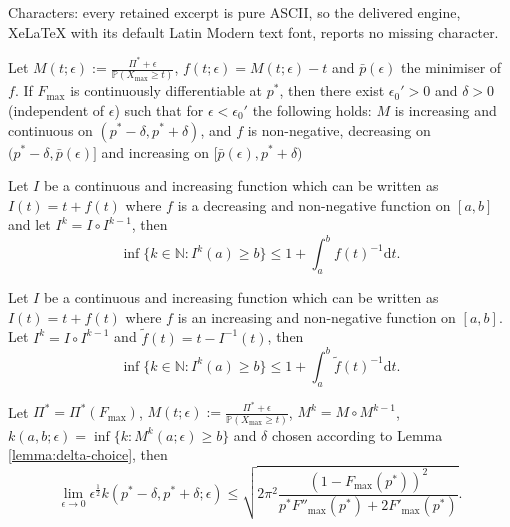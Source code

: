 \documentclass[10pt,a4paper]{amsart}
\begin{document}
Characters: every retained excerpt is pure ASCII, so the delivered engine, XeLaTeX with its default Latin Modern text font, reports no missing character.
    \begin{lemma}
        \label{lemma:delta-choice}
        Let $M(t;\epsilon):=\frac{\Pi^*+\epsilon}{\mathbb{P}(X_{\max}\ge t)}$, $f(t;\epsilon)=M(t;\epsilon)-t$ and $\bar{p}(\epsilon)$ the minimiser of $f$. 
        If $F_{\max}$ is continuously differentiable at $p^*$, then there exist $\epsilon_0'>0$ and $\delta>0$ (independent of $\epsilon$) such that for $\epsilon<\epsilon_0'$ the following holds: $M$ is increasing and continuous on $(p^*-\delta,p^*+\delta)$, and $f$ is non-negative, decreasing on $(p^*-\delta,\bar{p}(\epsilon)]$ and increasing on $[\bar{p}(\epsilon),p^*+\delta)$
    \end{lemma}

\begin{lemma}
    \label{lemma:stopping-time-difference-equation-1}
    Let $I$ be a continuous and increasing function which can be written as $I(t)=t+f(t)$ where $f$ is a decreasing and non-negative function on $[a,b]$ and let $I^k=I\circ I^{k-1}$, then
    $$
    \inf\{k\in\mathbb{N} : I^k(a)\ge b\}\le 1 + \int_a^bf(t)^{-1}\mathrm{d}t.
    $$
\end{lemma}

\begin{lemma}
    \label{lemma:stopping-time-difference-equation-2}
    Let $I$ be a continuous and increasing function which can be written as $I(t)=t+f(t)$ where $f$ is an increasing and non-negative function on $[a,b]$. Let $I^k=I\circ I^{k-1}$ and $\tilde{f}(t)=t-I^{-1}(t)$, then
    $$
    \inf\{k\in\mathbb{N}  : I^k(a)\ge b\}\le 1 + \int_a^b\tilde{f}(t)^{-1}\mathrm{d}t.
    $$
\end{lemma}

\begin{lemma}\label{lemma:technical-upperbound-argument}
Let $\Pi^*=\Pi^*(F_{\max})$, $M(t;\epsilon):=\frac{\Pi^*+\epsilon}{\mathbb{P}(X_{\max}\ge t)}$, $M^k=M\circ M^{k-1}$, $k(a,b;\epsilon)=\inf\{k:M^k(a;\epsilon)\ge b\}$ and $\delta$ chosen according to Lemma \ref{lemma:delta-choice}, then 
    $$
    \lim_{\epsilon\to 0}\epsilon^{\frac{1}{2}}k(p^*-\delta,p^*+\delta;\epsilon)\le\sqrt{2\pi^2\frac{(1-F_{\max}(p^*))^2}{p^*F''_{\max}(p^*)+2F'_{\max}(p^*)}}.
    $$
\end{lemma}
\end{document}
